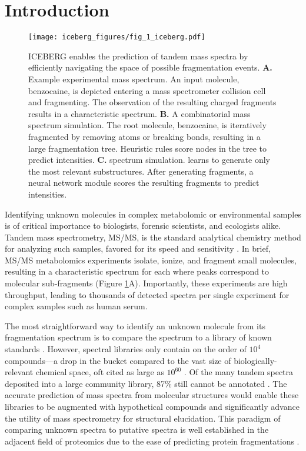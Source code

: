 \documentclass[journal=jcim,manuscript=article]{achemso}
\begin{document}
\section{Introduction}
\label{sec:intro}
\begin{figure}
  \centering
  \vspace{-2em}
  \texttt{[image: iceberg\_figures/fig\_1\_iceberg.pdf]}
  \caption{
    ICEBERG enables the prediction of tandem mass spectra by efficiently navigating the space of possible fragmentation events. \textbf{A.} Example experimental mass spectrum. An input molecule, benzocaine, is depicted entering a mass spectrometer collision cell and fragmenting. The observation of the resulting charged fragments results in a characteristic spectrum. \textbf{B.} A combinatorial mass spectrum simulation. The root molecule, benzocaine, is iteratively fragmented by removing atoms or breaking bonds, resulting in a large fragmentation tree. Heuristic rules score nodes in the tree to predict intensities. \textbf{C.} \ourModel spectrum simulation. \ourModel learns to generate only the most relevant substructures. After generating fragments, a neural network module scores the resulting fragments to predict intensities. %
  }
\label{fig:icebergTeaser}
\end{figure}

Identifying unknown molecules in complex metabolomic or environmental samples is of critical importance to biologists\cite{wishart_metabolomics_2019}, forensic scientists\cite{szeremeta_ijms_2021}, and ecologists alike\cite{bundy_environmental_2009}. Tandem mass spectrometry, MS/MS, is the standard analytical chemistry method for analyzing such samples, favored for its speed and sensitivity \cite{neumann_computational_2010}. In brief, MS/MS metabolomics experiments isolate, ionize, and fragment small molecules, resulting in a characteristic spectrum for each where peaks correspond to molecular sub-fragments (Figure \ref{fig:icebergTeaser}A). Importantly, these experiments are high throughput, leading to thousands of detected spectra per single experiment for complex samples such as human serum. 

The most straightforward way to identify an unknown molecule from its fragmentation spectrum is to compare the spectrum to a library of known standards \cite{bittremieux2022critical}. However, spectral libraries only contain on the order of $10^4$ compounds---a drop in the bucket compared to the vast size of biologically-relevant chemical space, oft cited as large as $10^{60}$ \cite{kirkpatrick2004chemical}. Of the many tandem spectra deposited into a large community library, 87\% still cannot be annotated \cite{bittremieux2022critical}. The accurate prediction of mass spectra from molecular structures would enable these libraries to be augmented with hypothetical compounds and significantly advance the utility of mass spectrometry for structural elucidation. This paradigm of comparing unknown spectra to putative spectra is well established in the adjacent field of proteomics due to the ease of predicting protein fragmentations  \cite{frewen2006analysis}.
\end{document}

